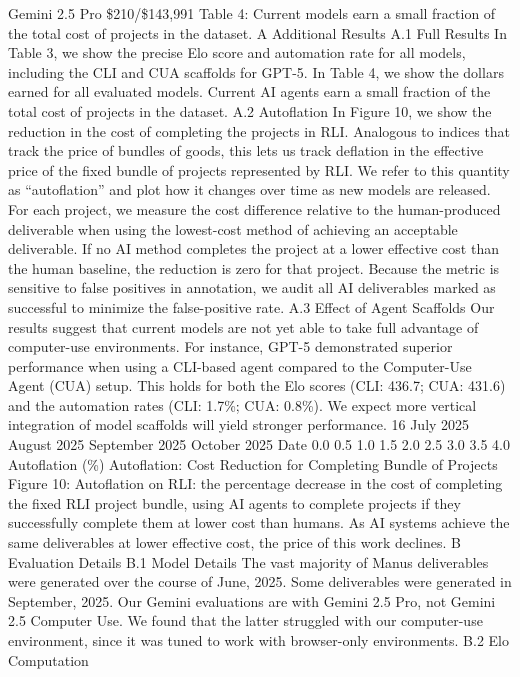 Gemini 2.5 Pro
\$210/\$143,991
Table 4: Current models earn a small fraction of the total cost of projects in the dataset.
A
Additional Results
A.1
Full Results
In Table 3, we show the precise Elo score and automation rate for all models, including the CLI and
CUA scaffolds for GPT-5.
In Table 4, we show the dollars earned for all evaluated models. Current AI agents earn a small
fraction of the total cost of projects in the dataset.
A.2
Autoflation
In Figure 10, we show the reduction in the cost of completing the projects in RLI. Analogous to
indices that track the price of bundles of goods, this lets us track deflation in the effective price of the
fixed bundle of projects represented by RLI. We refer to this quantity as “autoflation” and plot how it
changes over time as new models are released.
For each project, we measure the cost difference relative to the human-produced deliverable when
using the lowest-cost method of achieving an acceptable deliverable. If no AI method completes
the project at a lower effective cost than the human baseline, the reduction is zero for that project.
Because the metric is sensitive to false positives in annotation, we audit all AI deliverables marked as
successful to minimize the false-positive rate.
A.3
Effect of Agent Scaffolds
Our results suggest that current models are not yet able to take full advantage of computer-use
environments. For instance, GPT-5 demonstrated superior performance when using a CLI-based
agent compared to the Computer-Use Agent (CUA) setup. This holds for both the Elo scores (CLI:
436.7; CUA: 431.6) and the automation rates (CLI: 1.7\%; CUA: 0.8\%). We expect more vertical
integration of model scaffolds will yield stronger performance.
16
July 2025
August 2025
September 2025
October 2025
Date
0.0
0.5
1.0
1.5
2.0
2.5
3.0
3.5
4.0
Autoflation (\%)
Autoflation: Cost Reduction for Completing Bundle of Projects
Figure 10: Autoflation on RLI: the percentage decrease in the cost of completing the fixed RLI project
bundle, using AI agents to complete projects if they successfully complete them at lower cost than
humans. As AI systems achieve the same deliverables at lower effective cost, the price of this work
declines.
B
Evaluation Details
B.1
Model Details
The vast majority of Manus deliverables were generated over the course of June, 2025. Some
deliverables were generated in September, 2025.
Our Gemini evaluations are with Gemini 2.5 Pro, not Gemini 2.5 Computer Use. We found that the
latter struggled with our computer-use environment, since it was tuned to work with browser-only
environments.
B.2
Elo Computation

